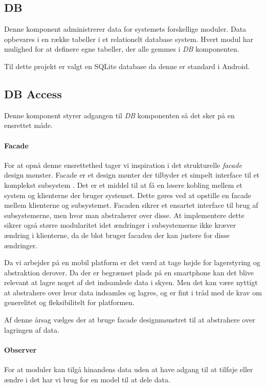 \subsection*{DB}
Denne komponent administrerer data for systemets forskellige moduler.
Data opbevares i en række tabeller i et relationelt database system.
Hvert modul har mulighed for at definere egne tabeller, der alle gemmes i \textit{DB} komponenten.

Til dette projekt er valgt en SQLite database da denne er standard i Android.


\subsection*{DB Access}
Denne komponent styrer adgangen til \textit{DB} komponenten så det sker på en ensrettet måde.
\paragraph{Facade}
For at opnå denne ensrettethed tager vi inspiration i det strukturelle \textit{facade} design mønster.
Facade er et design mønter der tilbyder et simpelt interface til et komplekst subsystem \citep{DATGANGOFFOUR}. 
Det er et middel til at få en løsere kobling mellem et system og klienterne der bruger systemet.
Dette gøres ved at opstille en facade mellem klienterne og subsystemet.
Facaden sikrer et ensartet interface til brug af subsystemerne, men hvor man abstraherer over disse.
At implementere dette sikrer også større modularitet idet ændringer i subsystemerne ikke kræver ændring i klienterne, da de blot bruger facaden der kan justere for disse ændringer.

Da vi arbejder på en mobil platform er det værd at tage højde for lagerstyring og abstraktion derover.
Da der er begrænset plads på en smartphone kan det blive relevant at lagre noget af det indsamlede data i skyen.
Men det kan være nyttigt at abstrahere over hvor data indsamles og lagres, og er fint i tråd med de krav om generelitet og fleksibilitelt for platformen.

Af denne årsag vælges der at bruge facade designmønstret til at abstrahere over lagringen af data.

\paragraph{Observer}
For at moduler kan tilgå hinandens data uden at have adgang til at tilføje eller ændre i det har vi brug for en model til at dele data.

